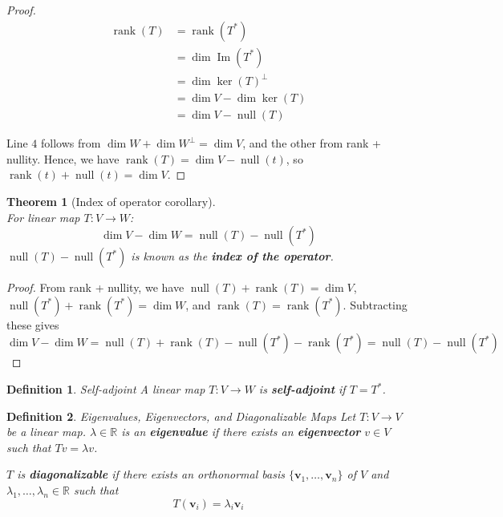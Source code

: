 \documentclass[12pt]{article}
\newtheorem{thm}{Theorem}[section] %
\theoremstyle{plain}
\newtheorem{definition}{Definition}[section]
\newcommand{\R}{\mathbb{R}}
\DeclareMathOperator{\nul}{null}
\DeclareMathOperator{\rank}{rank}
\DeclareMathOperator{\im}{Im}
\DeclareMathOperator{\vdim}{dim}
\newcommand{\vv}{\mathbf{v}}
\begin{document}
    \begin{proof}
        \begin{align}
            \rank(T) &= \rank(T^*)\\
            &= \vdim \im(T^{*}) \\
            &= \vdim \ker(T)^{\perp} \\
            &= \dim V - \dim \ker(T)\\
            &= \dim V - \nul (T)
        \end{align}

        Line $4$ follows from $\dim W + \dim W^{\bot} = \dim V$, and the other from rank + nullity. Hence, we have $\rank (T) = \dim V - \nul (t)$, so $\rank (t) + \nul (t) = \dim V$.
    \end{proof}

    \begin{thm}[Index of operator corollary]
        ~\\For linear map $T: V \to W$:$$\dim V - \dim  W = \nul (T) - \nul(T^*)$$
        $\nul (T) - \nul(T^*)$ is known as the \textbf{index of the operator}.
    \end{thm}

    \begin{proof}
        From rank + nullity, we have $\nul (T) + \rank (T) = \dim V$, $\nul (T^*) + \rank (T^*) = \dim W$, and $\rank (T) = \rank (T^*)$. Subtracting these gives 
        $$\dim V - \dim W = \nul (T) + \rank (T) - \nul (T^*) - \rank (T^*) = \nul (T) - \nul (T^*)$$
    \end{proof}

    \begin{definition}{Self-adjoint}
        A linear map $T:V \to W$ is \textbf{self-adjoint} if $T = T^{*}$.
    \end{definition}

    \begin{definition}{Eigenvalues, Eigenvectors, and Diagonalizable Maps}
        Let $T:V \to V$ be a linear map. $\lambda \in \R$ is an \textbf{eigenvalue} if there exists an \textbf{eigenvector} $v \in V$ such that $Tv = \lambda v$.

        $T$ is \textbf{diagonalizable} if there exists an orthonormal basis $\{\vv_1, \dots, \vv_n\}$ of $V$ and $\lambda_1, \dots, \lambda_n \in \R$ such that $$T(\vv_i) = \lambda_i \vv_i$$
    \end{definition}
\end{document}
